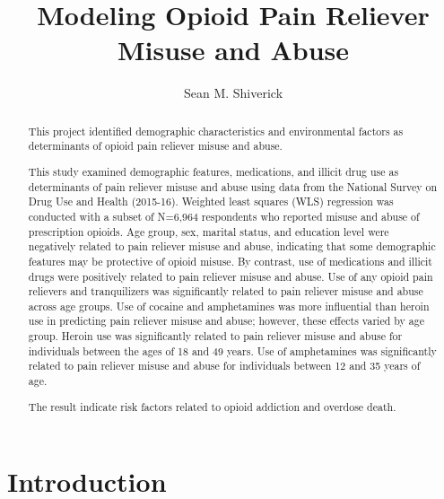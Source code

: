 \documentclass[sigconf]{acmart}
\begin{document}
\title{Modeling Opioid Pain Reliever Misuse and Abuse}

  \author{Sean M. Shiverick}

\renewcommand{\shortauthors}{S.M. Shiverick}


\begin{abstract}
This project identified demographic characteristics and environmental factors 
as determinants of opioid pain reliever misuse and abuse.

This study examined demographic features, medications, and illicit drug use 
as determinants of pain reliever misuse and abuse using data from the National 
Survey on Drug Use and Health (2015-16). Weighted least squares (WLS) regression
was conducted with a subset of N=6,964 respondents who reported misuse and abuse 
of prescription opioids. Age group, sex, marital status, and education
level were negatively related to pain reliever misuse and abuse, indicating that
some demographic features may be protective of opioid misuse. By contrast, use of 
medications and illicit drugs were positively related to pain reliever misuse 
and abuse. Use of any opioid pain relievers and tranquilizers was significantly
related to pain reliever misuse and abuse across age groups. Use of cocaine and 
amphetamines was more influential than heroin use in predicting pain reliever 
misuse and abuse; however, these effects varied by age group. Heroin use was 
significantly related to pain reliever misuse and abuse for individuals between 
the ages of 18 and 49 years. Use of amphetamines was significantly related to 
pain reliever misuse and abuse for individuals between 12 and 35 years of age. 


The result indicate risk factors related to opioid addiction and overdose death. 
\end{abstract}


\maketitle

\section{Introduction}
\end{document}

